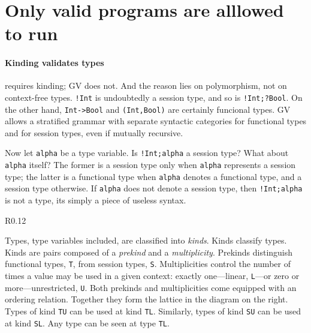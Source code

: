 \section{Only valid programs are alllowed to run}
\label{sec:valid}

\paragraph{Kinding validates types}

\freest{} requires kinding; GV does not. And the reason lies on
polymorphism, not on context-free types.
%
\lstinline|!Int| is undoubtedly a session type, and so is
\lstinline|!Int;?Bool|. On the other hand, \lstinline|Int->Bool| and
\lstinline|(Int,Bool)| are certainly funcional types. GV allows a
stratified grammar with separate syntactic categories for functional
types and for session types, even if mutually recursive.

Now let \lstinline|alpha| be a type variable. Is
\lstinline|!Int;alpha| a session type? What about \lstinline|alpha|
itself? The former is a session type only when \lstinline|alpha|
represents a session type; the latter is a functional type when
\lstinline|alpha| denotes a functional type, and a session type
otherwise. If \lstinline|alpha| does not denote a session type, then
\lstinline|!Int;alpha| is not a type, its simply a piece of useless
syntax.

\begin{wrapfigure}{R}{0.12\textwidth}
\end{wrapfigure}
%
Types, type variables included, are classified into \emph{kinds}. 
%
Kinds classify types. Kinds are pairs composed of a \emph{prekind} and
a \emph{multiplicity}. Prekinds distinguish functional types,
\lstinline|T|, from session types, \lstinline|S|.
%
Multiplicities control the number of times a value may be used in a
given context: exactly one---linear, \lstinline|L|---or zero or
more---unrestricted, \lstinline|U|. Both prekinds and multiplicities
come equipped with an ordering relation. Together they form the
lattice in the diagram on the right.
%
Types of kind \lstinline|TU| can be used at kind
\lstinline|TL|. Similarly, types of kind \lstinline|SU| can be used
at kind \lstinline|SL|. Any type can be seen at type \lstinline|TL|.

